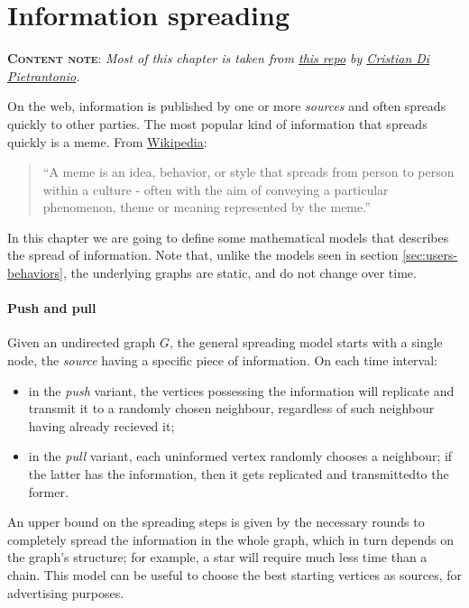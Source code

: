 \chapter[Information spreading]{Information spreading}

\textbf{\textsc{Content note}}: \emph{Most of this chapter is taken from \href{https://github.com/Halolegend94/uni_social_behavioral_networks/blob/master/chapters/ch01-meme-flow.tex}{this repo} by \href{https://github.com/Halolegend94}{Cristian Di Pietrantonio}.}
\vspace{2ex}

On the web, information is published by one or more \emph{sources} and often spreads quickly to other parties. The most popular kind of information that spreads quickly is a meme. From \href{https://en.wikipedia.org/wiki/Meme}{Wikipedia}:

\begin{quote}
	``A meme is an idea, behavior, or style that spreads from person to person within a culture - often with the aim of conveying a particular phenomenon, theme or meaning represented by the meme.''
\end{quote}

In this chapter we are going to define some mathematical models that describes the spread of information. Note that, unlike  the models seen in section \ref{sec:users-behaviors}, the underlying graphs are static, and do not change over time.

\subsubsection{Push and pull}

Given an undirected graph $G$, the general spreading model starts with a single node, the \emph{source} having a specific piece of information. On each time interval:
\begin{itemize}
    \item in the \emph{push} variant, the vertices possessing the information will replicate and transmit it to a randomly chosen neighbour, regardless of such neighbour having already recieved it;
    \item in the \emph{pull} variant, each uninformed vertex randomly chooses a neighbour; if the latter has the information, then it gets replicated and transmittedto the former.
\end{itemize}

An upper bound on the spreading steps is given by the necessary rounds to completely spread the information in the whole graph, which in turn depends on the graph's structure; for example, a star will require much less time than a chain. This model can be useful to choose the best starting vertices as sources, for advertising purposes.


